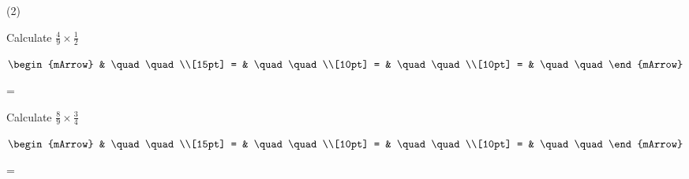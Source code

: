 \clearpage\noindent%
\begin{mtask}(2)
   \task \begin{exercise} Calculate $ \frac{4}{9} \times \frac{1}{2} $
           \begin{envSolution}
             $\begin{mArrow} 
			       & \quad \quad              \\[15pt]
                 = & \quad \quad              \\[10pt]
		   		 = & \quad \quad              \\[10pt]
				 = & \quad \quad 
              \end{mArrow}$
            \begin{shortsolution}  
			     =$ \quad \quad \quad \quad $
			\end{shortsolution}				 
           \end{envSolution}
         \end{exercise}
   \task \begin{exercise} Calculate $ \frac{8}{9} \times \frac{3}{4} $
           \begin{envSolution}
             $\begin{mArrow} 
			       & \quad \quad              \\[15pt]
                 = & \quad \quad              \\[10pt]
		   		 = & \quad \quad              \\[10pt]
				 = & \quad \quad 
              \end{mArrow}$
            \begin{shortsolution}  
			     =$ \quad \quad \quad \quad $
			\end{shortsolution}				 
           \end{envSolution}
         \end{exercise}
\end{mtask}




